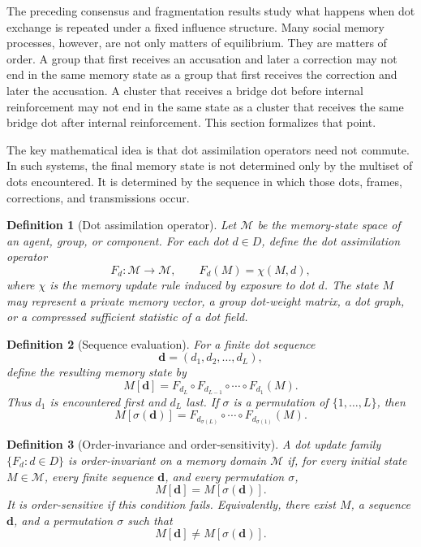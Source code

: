 \documentclass[11pt]{article}
\newtheorem{definition}{Definition}
\theoremstyle{remark}
\begin{document}
The preceding consensus and fragmentation results study what happens
when dot exchange is repeated under a fixed influence structure. Many
social memory processes, however, are not only matters of equilibrium.
They are matters of order. A group that first receives an accusation and
later a correction may not end in the same memory state as a group that
first receives the correction and later the accusation. A cluster that
receives a bridge dot before internal reinforcement may not end in the
same state as a cluster that receives the same bridge dot after internal
reinforcement. This section formalizes that point.

The key mathematical idea is that dot assimilation operators need not
commute. In such systems, the final memory state is not determined only
by the multiset of dots encountered. It is determined by the sequence in
which those dots, frames, corrections, and transmissions occur.

\begin{definition}[Dot assimilation operator]\label{def:dot-assimilation}
Let $\mathcal{M}$ be the memory-state space of an agent, group, or
component. For each dot $d\in D$, define the dot assimilation operator
$$
F_d:\mathcal{M}\to\mathcal{M},
\qquad
F_d(M)=\chi(M,d),
$$
where $\chi$ is the memory update rule induced by exposure to dot $d$.
The state $M$ may represent a private memory vector, a group dot-weight
matrix, a dot graph, or a compressed sufficient statistic of a dot field.
\end{definition}

\begin{definition}[Sequence evaluation]\label{def:sequence-evaluation}
For a finite dot sequence
$$
\mathbf d=(d_1,d_2,\ldots,d_L),
$$
define the resulting memory state by
$$
M[\mathbf d]
=F_{d_L}\circ F_{d_{L-1}}\circ\cdots\circ F_{d_1}(M).
$$
Thus $d_1$ is encountered first and $d_L$ last. If $\sigma$ is a
permutation of $\{1,\ldots,L\}$, then
$$
M[\sigma(\mathbf d)]
=F_{d_{\sigma(L)}}\circ\cdots\circ F_{d_{\sigma(1)}}(M).
$$
\end{definition}

\begin{definition}[Order-invariance and order-sensitivity]\label{def:order-invariance}
A dot update family $\{F_d:d\in D\}$ is \emph{order-invariant} on a
memory domain $\mathcal{M}$ if, for every initial state $M\in\mathcal{M}$,
every finite sequence $\mathbf d$, and every permutation $\sigma$,
$$
M[\mathbf d]=M[\sigma(\mathbf d)].
$$
It is \emph{order-sensitive} if this condition fails. Equivalently,
there exist $M$, a sequence $\mathbf d$, and a permutation $\sigma$ such
that
$$
M[\mathbf d]\neq M[\sigma(\mathbf d)].
$$
\end{definition}
\end{document}
